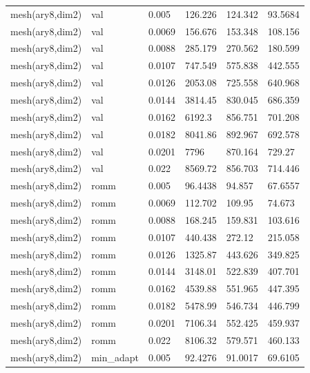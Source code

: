 \begin{longtable}[H]{llllll}
mesh(ary8,dim2) & val                         & 0.005  & 126.226 & 124.342 & 93.5684 \\
mesh(ary8,dim2) & val                         & 0.0069 & 156.676 & 153.348 & 108.156 \\
mesh(ary8,dim2) & val                         & 0.0088 & 285.179 & 270.562 & 180.599 \\
mesh(ary8,dim2) & val                         & 0.0107 & 747.549 & 575.838 & 442.555 \\
mesh(ary8,dim2) & val                         & 0.0126 & 2053.08 & 725.558 & 640.968 \\
mesh(ary8,dim2) & val                         & 0.0144 & 3814.45 & 830.045 & 686.359 \\
mesh(ary8,dim2) & val                         & 0.0162 & 6192.3  & 856.751 & 701.208 \\
mesh(ary8,dim2) & val                         & 0.0182 & 8041.86 & 892.967 & 692.578 \\
mesh(ary8,dim2) & val                         & 0.0201 & 7796    & 870.164 & 729.27  \\
mesh(ary8,dim2) & val                         & 0.022  & 8569.72 & 856.703 & 714.446 \\ \hline
mesh(ary8,dim2) & romm                        & 0.005  & 96.4438 & 94.857  & 67.6557 \\
mesh(ary8,dim2) & romm                        & 0.0069 & 112.702 & 109.95  & 74.673  \\
mesh(ary8,dim2) & romm                        & 0.0088 & 168.245 & 159.831 & 103.616 \\
mesh(ary8,dim2) & romm                        & 0.0107 & 440.438 & 272.12  & 215.058 \\
mesh(ary8,dim2) & romm                        & 0.0126 & 1325.87 & 443.626 & 349.825 \\
mesh(ary8,dim2) & romm                        & 0.0144 & 3148.01 & 522.839 & 407.701 \\
mesh(ary8,dim2) & romm                        & 0.0162 & 4539.88 & 551.965 & 447.395 \\
mesh(ary8,dim2) & romm                        & 0.0182 & 5478.99 & 546.734 & 446.799 \\
mesh(ary8,dim2) & romm                        & 0.0201 & 7106.34 & 552.425 & 459.937 \\
mesh(ary8,dim2) & romm                        & 0.022  & 8106.32 & 579.571 & 460.133 \\ \hline
mesh(ary8,dim2) & min\_adapt                  & 0.005  & 92.4276 & 91.0017 & 69.6105 \\

\end{longtable}
